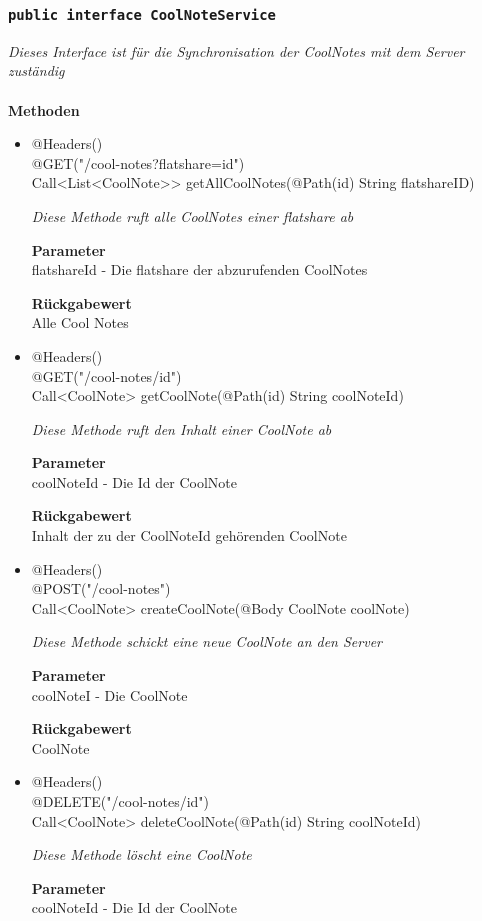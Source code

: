 	\subsubsection{\texttt{public interface CoolNoteService }}
\textit{Dieses Interface ist für die Synchronisation der CoolNotes mit dem Server zuständig}\\
\\
	\textbf{Methoden} \\
		\begin{itemize}
		\item{@Headers()\\@GET("/cool-notes?flatshare={id}")\\ Call<List<CoolNote>> getAllCoolNotes(@Path(\grqq id\grqq) String flatshareID)} 

		\textit{Diese Methode ruft alle CoolNotes einer flatshare ab}

		\textbf{Parameter} \\
	flatshareId - Die flatshare der abzurufenden CoolNotes

		\textbf{Rückgabewert} \\
	Alle Cool Notes

      \item{@Headers() \\ @GET("/cool-notes/{id}")\\ Call<CoolNote> getCoolNote(@Path(\grqq id\grqq) String coolNoteId)}

		\textit{Diese Methode ruft den Inhalt einer CoolNote ab }

		\textbf{Parameter} \\
		coolNoteId - Die Id der CoolNote 

		\textbf{Rückgabewert} \\
	Inhalt der zu der CoolNoteId gehörenden CoolNote

      \item{@Headers() \\ @POST("/cool-notes")\\ Call<CoolNote> createCoolNote(@Body CoolNote coolNote)}

		\textit{Diese Methode schickt eine neue CoolNote an den Server }

		\textbf{Parameter} \\
		coolNoteI - Die CoolNote 

		\textbf{Rückgabewert} \\
	CoolNote


      \item{@Headers() \\ @DELETE("/cool-notes/{id}")\\ Call<CoolNote> deleteCoolNote(@Path(\grqq id\grqq) String coolNoteId)}

		\textit{Diese Methode löscht eine CoolNote }

		\textbf{Parameter} \\
		coolNoteId - Die Id der CoolNote 


	 \end{itemize}


